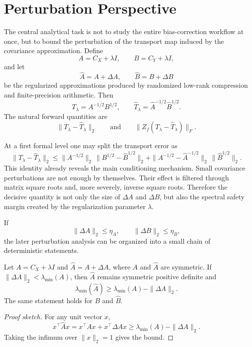 \section{Perturbation Perspective}

The central analytical task is not to study the entire bias-correction workflow at once, but to bound the perturbation of the transport map induced by the covariance approximation. Define
\[
	A = C_X + \lambda I,
	\qquad
	B = C_Y + \lambda I,
\]
and let
\[
	\widehat A = A + \Delta A,
	\qquad
	\widehat B = B + \Delta B
\]
be the regularized approximations produced by randomized low-rank compression and finite-precision arithmetic. Then
\[
	T_\lambda = A^{-1/2}B^{1/2},
	\qquad
	\widehat T_\lambda = \widehat A^{-1/2}\widehat B^{1/2}.
\]
The natural forward quantities are
\[
	\|T_\lambda - \widehat T_\lambda\|_2
	\qquad \text{and} \qquad
	\|Z_f(T_\lambda - \widehat T_\lambda)\|_F.
\]

At a first formal level one may split the transport error as
\[
	\|T_\lambda - \widehat T_\lambda\|_2
	\le
	\|A^{-1/2}\|_2\,\|B^{1/2} - \widehat B^{1/2}\|_2
	+
	\|A^{-1/2} - \widehat A^{-1/2}\|_2\,\|\widehat B^{1/2}\|_2.
\]
This identity already reveals the main conditioning mechanism. Small covariance perturbations are not enough by themselves. Their effect is filtered through matrix square roots and, more severely, inverse square roots. Therefore the decisive quantity is not only the size of \(\Delta A\) and \(\Delta B\), but also the spectral safety margin created by the regularization parameter \(\lambda\).

If
\[
	\|\Delta A\|_2 \le \eta_A,
	\qquad
	\|\Delta B\|_2 \le \eta_B,
\]
the later perturbation analysis can be organized into a small chain of deterministic
statements.

\begin{proposition}
	Let \(A = C_X + \lambda I\) and \(\widehat A = A + \Delta A\), where \(A\) and
	\(\widehat A\) are symmetric. If \(\|\Delta A\|_2 < \lambda_{\min}(A)\), then
	\(\widehat A\) remains symmetric positive definite and
	\[
		\lambda_{\min}(\widehat A) \ge \lambda_{\min}(A) - \|\Delta A\|_2.
	\]
	The same statement holds for \(B\) and \(\widehat B\).
\end{proposition}

\begin{proof}[Proof sketch]
	For any unit vector \(x\),
	\[
		x^\top \widehat A x = x^\top A x + x^\top \Delta A x
		\ge \lambda_{\min}(A) - \|\Delta A\|_2.
	\]
	Taking the infimum over \(\|x\|_2 = 1\) gives the bound.
\end{proof}

